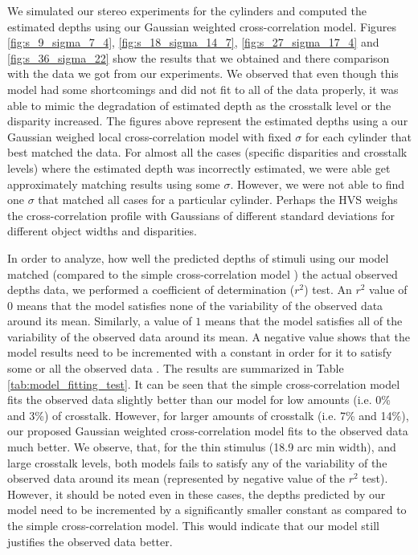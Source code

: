 We simulated our stereo experiments for the cylinders and computed the estimated depths using our Gaussian weighted cross-correlation model. Figures \ref{fig:s_9_sigma_7_4}, \ref{fig:s_18_sigma_14_7}, \ref{fig:s_27_sigma_17_4} and \ref{fig:s_36_sigma_22} show the results that we obtained and there comparison with the data we got from our experiments. We observed that even though this model had some shortcomings and did not fit to all of the data properly, it was able to mimic the degradation of estimated depth as the crosstalk level or the disparity increased. The figures above represent the estimated depths using a our Gaussian weighed local cross-correlation model with fixed $\sigma$ for each cylinder that best matched the data. For almost all the cases (specific disparities and crosstalk levels) where the estimated depth was incorrectly estimated, we were able get approximately matching results using some $\sigma$. However, we were not able to find one $\sigma$ that matched all cases for a particular cylinder. Perhaps the HVS weighs the cross-correlation profile with Gaussians of different standard deviations for different object widths and disparities. 

In order to analyze, how well the predicted depths of stimuli using our model matched (compared to the simple cross-correlation model \cite{filippini2009limits}) the actual observed depths data, we performed a coefficient of determination ($r^2$) test. An $r^2$ value of $0$ means that the model satisfies none of the variability of the observed data around its mean. Similarly, a value of $1$ means that the model satisfies all of the variability of the observed data around its mean. A negative value shows that the model results need to be incremented with a constant in order for it to satisfy some or all the observed data \cite{ Model_fitting}. The results are summarized in Table \ref{tab:model_fitting_test}. It can be seen that the simple cross-correlation model fits the observed data slightly better than our model for low amounts (i.e. 0\% and 3\%) of crosstalk. However, for larger amounts of crosstalk (i.e. 7\% and 14\%), our proposed Gaussian weighted cross-correlation model fits to the observed data much better. We observe, that, for the thin stimulus (18.9 arc min width), and large crosstalk levels, both models fails to satisfy any of the variability of the observed data around its mean (represented by negative value of the $r^2$ test). However, it should be noted even in these cases, the depths predicted by our model need to be incremented by a significantly smaller constant as compared to the simple cross-correlation model. This would indicate that our model still justifies the observed data better. 

